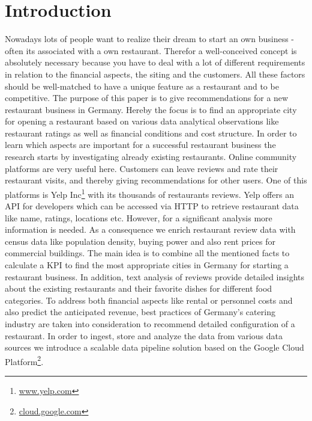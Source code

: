 \section{Introduction}
\label{sec:introduction}
Nowadays lots of people want to realize their dream to start an own business - often its associated with a own restaurant. Therefor a well-conceived concept is absolutely necessary because you have to deal with a lot of different requirements in relation to the financial aspects, the siting and the customers. All these factors should be well-matched to have a unique feature as a restaurant and to be competitive. \newline
The purpose of this paper is to give recommendations for a new restaurant business in Germany. Hereby the focus is to find an appropriate city for opening a restaurant based on various data analytical observations like restaurant ratings as well as financial conditions and cost structure.
In order to learn which aspects are important for a successful restaurant business the research starts by investigating already existing restaurants. Online community platforms are very useful here. Customers can leave reviews and rate their restaurant visits, and thereby giving recommendations for other users. One of this platforms is Yelp Inc\footnote{\href{https://www.yelp.com/}{www.yelp.com}} with its thousands of restaurants reviews. Yelp offers an \ac{API} for developers which can be accessed via HTTP to retrieve restaurant data like name, ratings, locations etc. However, for a significant analysis more information is needed. As a consequence we enrich restaurant review data with census data like population density, buying power and also rent prices for commercial buildings. The main idea is to combine all the mentioned facts to calculate a \ac{KPI} to find the most appropriate cities in Germany for starting a restaurant business. In addition, text analysis of reviews provide detailed insights about the existing restaurants and their favorite dishes for different food categories. To address both financial aspects like rental or personnel costs and also predict the anticipated revenue, best practices of Germany's catering industry are taken into consideration to recommend detailed configuration of a restaurant. In order to ingest, store and analyze the data from various data sources we introduce a scalable data pipeline solution based on the Google Cloud Platform\footnote{\href{https://cloud.google.com/}{cloud.google.com}}.


